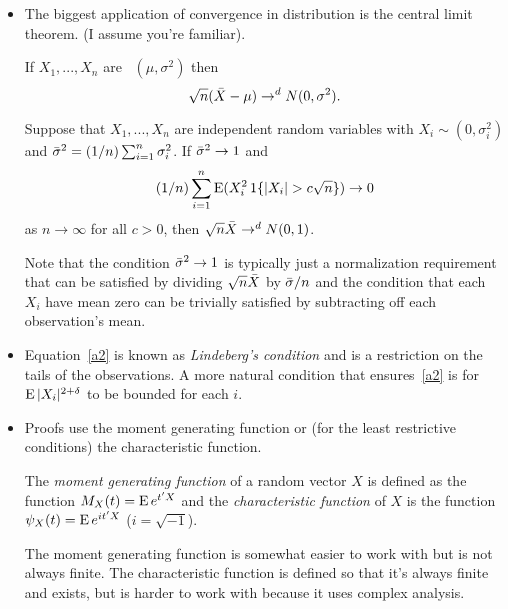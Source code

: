 \begin{itemize}

\item The biggest application of convergence in distribution is the
  central limit theorem.  (I assume you're familiar).

  \begin{thm}
    If $X_1,...,X_n$ are \iid\ $(\mu, \sigma^2)$ then
    \begin{equation*}
      \sqrt{n} (\bar{X} - \mu) \to^d N(0,\sigma^2).
    \end{equation*}
  \end{thm}

  \begin{thm}
    Suppose that $X_1,...,X_n$ are independent random variables with
    $X_i \sim (0, \sigma^2_i)$ and $\bar{\sigma}^2 = (1/n) \sum_{i=1}^n \sigma^2_i$.  If $\bar{\sigma}^2 \to 1$
    and
    \begin{equation}\label{a2}
      (1/n) \sum_{i=1}^n \E( X_i^2 \ind\{ |X_i| > c \sqrt{n} \} ) \to 0
    \end{equation}
    as $n \to \infty$ for all $c > 0$, then $\sqrt{n} \bar{X} \to^d N(0, 1)$.
  \end{thm}
  Note that the condition $\bar{\sigma}^2 \to 1$ is typically just a normalization
  requirement that can be satisfied by dividing $\sqrt{n} \bar{X}$ by
  $\bar{\sigma}/n$ and the condition that each $X_i$ have mean zero can be
  trivially satisfied by subtracting off each observation's mean.

\item Equation~\eqref{a2} is known as \emph{Lindeberg's condition}
  and is a restriction on the tails of the observations.  A more
  natural condition that ensures~\eqref{a2} is for $\operatorname{E} |X_i|^{2 +
  \delta}$ to be bounded for each $i$.

\item Proofs use the moment generating function or (for the least
  restrictive conditions) the characteristic function.

  \begin{defn}
    The \emph{moment generating function} of a random vector $X$ is
    defined as the function $M_X(t) = \operatorname{E} e^{t'X}$ and the
    \emph{characteristic function} of $X$ is the function $\psi_X(t) = \operatorname{E}
    e^{it'X}$ ($i = \sqrt{-1}$).
  \end{defn}

  The moment generating function is somewhat easier to work with but is
  not always finite.  The characteristic function is defined so that
  it's always finite and exists, but is harder to work with because it
  uses complex analysis.


\end{itemize}
